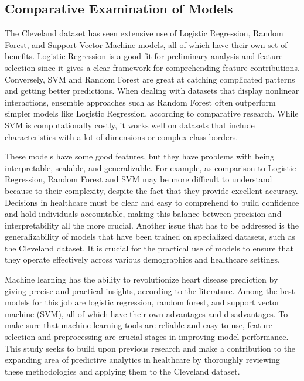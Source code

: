 \subsection{Comparative Examination of Models}
The Cleveland dataset has seen extensive use of Logistic Regression, Random Forest, and Support Vector Machine models, all of which have their own set of benefits. Logistic Regression is a good fit for preliminary analysis and feature selection since it gives a clear framework for comprehending feature contributions. Conversely, SVM and Random Forest are great at catching complicated patterns and getting better predictions. When dealing with datasets that display nonlinear interactions, ensemble approaches such as Random Forest often outperform simpler models like Logistic Regression, according to comparative research. While SVM is computationally costly, it works well on datasets that include characteristics with a lot of dimensions or complex class borders.

These models have some good features, but they have problems with being interpretable, scalable, and generalizable. For example, as comparison to Logistic Regression, Random Forest and SVM may be more difficult to understand because to their complexity, despite the fact that they provide excellent accuracy. Decisions in healthcare must be clear and easy to comprehend to build confidence and hold individuals accountable, making this balance between precision and interpretability all the more crucial. Another issue that has to be addressed is the generalizability of models that have been trained on specialized datasets, such as the Cleveland dataset. It is crucial for the practical use of models to ensure that they operate effectively across various demographics and healthcare settings.

Machine learning has the ability to revolutionize heart disease prediction by giving precise and practical insights, according to the literature. Among the best models for this job are logistic regression, random forest, and support vector machine (SVM), all of which have their own advantages and disadvantages. To make sure that machine learning tools are reliable and easy to use, feature selection and preprocessing are crucial stages in improving model performance. This study seeks to build upon previous research and make a contribution to the expanding area of predictive analytics in healthcare by thoroughly reviewing these methodologies and applying them to the Cleveland dataset.
